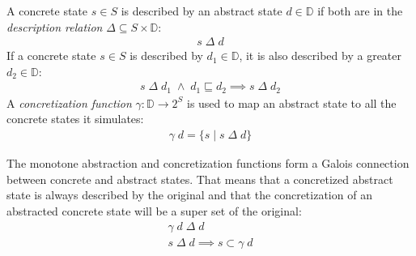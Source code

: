 A concrete state $s \in S$ is described by an abstract state $d \in \mathbb{D}$ if both are in the \textit{description relation} $\Delta \subseteq S \times \mathbb{D}$:
\begin{align}
s \;\Delta\; d
\end{align}
If a concrete state $s \in S$ is described by $d_1 \in \mathbb{D}$, it is also described by a greater $d_2 \in \mathbb{D}$:
\begin{align}
s \;\Delta\; d_1 \;\wedge\; d_1 \sqsubseteq d_2 \implies s \;\Delta\; d_2
\end{align}
A \textit{concretization function} $\gamma : \mathbb{D} \to 2^S$ is used to map an abstract state to all the concrete states it simulates:
\begin{align}
\gamma \; d = \{s \; | \; s \;\Delta\; d\}
\end{align}

The monotone abstraction and concretization functions form a Galois connection between concrete and abstract states.
That means that a concretized abstract state is always described by the original and that the concretization of an abstracted concrete state will be a super set of the original:
\begin{align}
\gamma \; d \;\Delta\; d\\
s \;\Delta\; d \implies s \subset \gamma \; d
\end{align}


